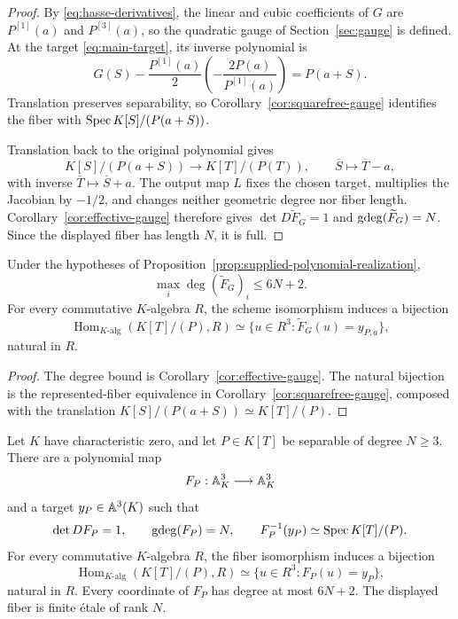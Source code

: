 \begin{proof}
By \eqref{eq:hasse-derivatives}, the linear and cubic coefficients of \(G\)
are \(P^{[1]}(a)\) and \(P^{[3]}(a)\), so the quadratic gauge of
Section~\ref{sec:gauge} is defined.  At the target
\eqref{eq:main-target}, its inverse polynomial is
\[
 G(S)-\frac{P^{[1]}(a)}2
       \left(-\frac{2P(a)}{P^{[1]}(a)}\right)
 =P(a+S).
\]
Translation preserves separability, so
Corollary~\ref{cor:squarefree-gauge} identifies the fiber with
\(\operatorname{Spec} K[S]/(P(a+S))\).

Translation back to the original polynomial gives
\[
 K[S]/(P(a+S))\longrightarrow K[T]/(P(T)),
 \qquad \overline S\longmapsto\overline T-a,
\]
with inverse \(\overline T\mapsto\overline S+a\).  The output map \(L\)
fixes the chosen target, multiplies the Jacobian by \(-1/2\), and changes
neither geometric degree nor fiber length.  Corollary~\ref{cor:effective-gauge}
therefore gives \(\det D\widetilde F_G=1\) and
\(\operatorname{gdeg}(\widetilde F_G)=N\).  Since the displayed fiber has length \(N\),
it is full.
\end{proof}

\begin{corollary}
\label{cor:polynomial-effective}
Under the hypotheses of
Proposition~\ref{prop:supplied-polynomial-realization},
\[
 \max_i\deg(\widetilde F_G)_i\leq6N+2.
\]
For every commutative \(K\)-algebra \(R\), the scheme isomorphism induces a
bijection
\[
 \operatorname{Hom}_{K\text{-alg}}(K[T]/(P),R)
 \simeq
 \{u\in R^3:\widetilde F_G(u)=y_{P,a}\},
\]
natural in \(R\).
\end{corollary}

\begin{proof}
The degree bound is Corollary~\ref{cor:effective-gauge}.  The natural
bijection is the represented-fiber equivalence in
Corollary~\ref{cor:squarefree-gauge}, composed with the translation
\(K[S]/(P(a+S))\simeq K[T]/(P)\).
\end{proof}

\begin{theorem}
\label{thm:polynomial-realization}
Let \(K\) have characteristic zero, and let \(P\in K[T]\) be separable of
degree \(N\geq3\).  There are a polynomial map
\[
 F_P:\mathbb A^3_K\longrightarrow\mathbb A^3_K
\]
and a target \(y_P\in\mathbb A^3(K)\) such that
\[
 \det DF_P=1,\qquad
 \operatorname{gdeg}(F_P)=N,\qquad
 F_P^{-1}(y_P)\simeq\operatorname{Spec} K[T]/(P).
\]
For every commutative \(K\)-algebra \(R\), the fiber isomorphism induces a
bijection
\[
 \operatorname{Hom}_{K\text{-alg}}(K[T]/(P),R)
 \simeq \{u\in R^3:F_P(u)=y_P\},
\]
natural in \(R\).  Every coordinate of \(F_P\) has degree at most \(6N+2\).
The displayed fiber is finite \'etale of rank \(N\).
\end{theorem}

